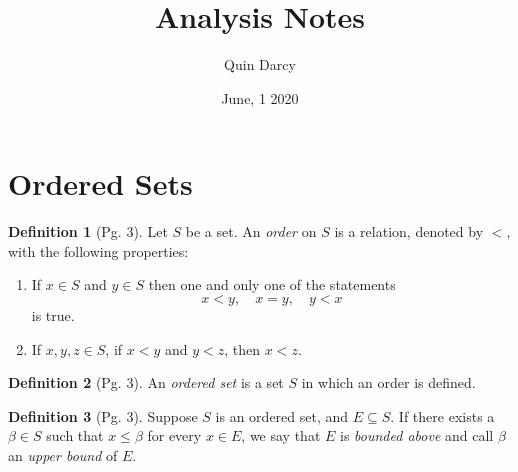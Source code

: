 \documentclass[leqno]{article}
\theoremstyle{definition}
\newtheorem{definition}{Definition}[section]
\theoremstyle{remark}
\begin{document}
\title{Analysis Notes}
\author{Quin Darcy}
\date{June, 1 2020}
\maketitle
    
    \section{Ordered Sets}
        \begin{definition}[Pg. 3]\label{def:1.1}
            Let $S$ be a set. An \emph{order} on $S$ is a relation, denoted by $<$, with the following properties:
                \begin{enumerate}[label=(\roman*)]
                    \item If $x\in S$ and $y\in S$ then one and only one of the statements
                        \begin{equation*}
                            x<y,\quad x=y,\quad y<x
                        \end{equation*}
                    is true.
                    \item If $x,y,z\in S$, if $x<y$ and $y<z$, then $x<z$. \cite{rud}
                \end{enumerate}
        \end{definition}
        \begin{definition}[Pg. 3]\label{def:1.2}
            An \emph{ordered set} is a set $S$ in which an order is defined. \cite{rud}
        \end{definition}
        \begin{definition}[Pg. 3]\label{def:1.3}
            Suppose $S$ is an ordered set, and $E\subseteq S$. If there exists a $\beta\in S$ such that $x\leq\beta$ for every $x\in E$, we say that $E$ is \emph{bounded above} and call $\beta$ an \emph{upper bound} of $E$. \cite{rud}
        \end{definition}
\end{document}
